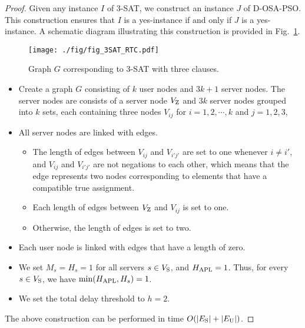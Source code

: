 \documentclass[10pt, letterpaper]{IEEEtran}
\newcommand\blue[1]{\textcolor{blue}{#1}}
\begin{document}
\begin{CJK}{UTF8}{ipxm}
\begin{proof}
  Given any instance $I$ of 3-SAT, we construct an instance $J$ of D-OSA-PSO. This construction ensures that $I$ is a yes-instance if and only if $J$ is a yes-instance. %
  A schematic diagram illustrating this construction is provided in Fig.~\ref{fig:3SAT_RTC}.
  \begin{figure}[!t]
    \begin{center}
      \texttt{[image: ./fig/fig\_3SAT\_RTC.pdf]}
    \end{center}
    \caption{Graph $G$ corresponding to 3-SAT with three clauses.}
    \label{fig:3SAT_RTC}
  \end{figure}

  \begin{itemize}
    \item Create a graph $G$ consisting of $k$ user nodes and $3k+1$ server nodes. The server nodes are consists of a server node $V_{\rm Z}$ and $3k$ server nodes grouped into $k$ sets, each containing three nodes $V_{ij}$ for $i = 1, 2, \cdots, k$ and $j = 1, 2, 3$, 
    \item All server nodes are linked with edges.
    \begin{itemize}
      \item The length of edges between $V_{ij}$ and $V_{i'j'}$ are set to one whenever $i \neq i'$, and $V_{ij}$ and $V_{i'j'}$ are not negations to each other, which means that the edge represents two nodes corresponding to elements that have a compatible true assignment.
      \item Each length of edges between $V_{\rm Z}$ and $V_{ij}$ is set to one.
      \item Otherwise, the length of edges is set to two.
    \end{itemize}
    \item Each user node is linked with edges that have a length of zero.
    \item We set $M_s = H_s = 1$ for all servers $s \in V_{\rm S}$, and $H_{\rm APL} = 1$. Thus, for every $s \in V_{\rm S}$, we have $\min(H_{\rm APL}, H_s) = 1$.
    \item We set the total delay threshold to $h = 2$.
  \end{itemize}
The above construction can be performed in time $O(|E_{\rm S}| + |E_{\rm U}|)$.



\end{proof}
\end{CJK}
\end{document}

